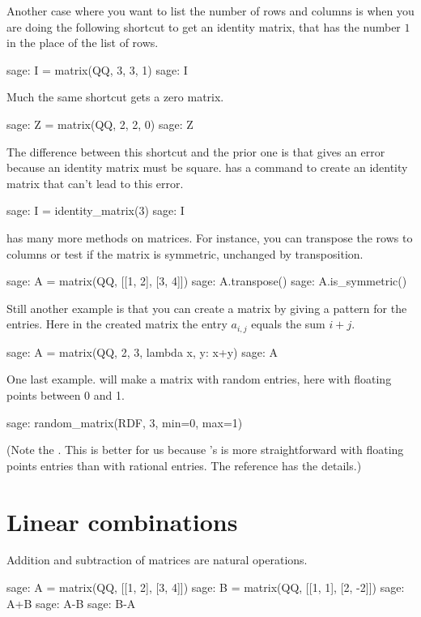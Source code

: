 Another case where you want to list the
number of rows and columns is when you are doing 
the following shortcut to get an identity matrix, that has 
the number $1$ in the place of the list of rows.
\begin{sagecommandline}
sage: I = matrix(QQ, 3, 3, 1)                     
sage: I
\end{sagecommandline}
Much the same shortcut gets a zero matrix.
\begin{sagecommandline}
sage: Z = matrix(QQ, 2, 2, 0)
sage: Z
\end{sagecommandline}
The difference between this shortcut and the prior one is that 
 gives an error because 
an identity matrix must be square.
\Sage{} has a command to create an identity matrix 
that can't lead to this error.
\begin{sagecommandline}
sage: I = identity_matrix(3)
sage: I
\end{sagecommandline}

\Sage{} has many more methods on matrices.
For instance, you can transpose the rows to columns or test if the 
matrix is symmetric,
unchanged by transposition.
\begin{sagecommandline}
sage: A = matrix(QQ, [[1, 2], [3, 4]])
sage: A.transpose()
sage: A.is_symmetric()
\end{sagecommandline}
Still another example is that you can create a matrix by giving a pattern
for the entries.
Here in the created matrix the entry $a_{i,j}$ equals the sum
$i+j$.
\begin{sagecommandline}
sage: A = matrix(QQ, 2, 3, lambda x, y: x+y)
sage: A
\end{sagecommandline}
One last example.
\Sage{} will make a matrix with random entries, here
with floating points between 0 and 1.
\begin{sagecommandline}
sage: random_matrix(RDF, 3, min=0, max=1)
\end{sagecommandline}
(Note the .
This is better for us because \Sage's  
is more straightforward with floating points entries than with 
rational entries.
The \Sage{} reference has the details.)




\section{Linear combinations}
Addition and subtraction of matrices are natural operations.
\begin{sagecommandline}
sage: A = matrix(QQ, [[1, 2], [3, 4]])
sage: B = matrix(QQ, [[1, 1], [2, -2]])
sage: A+B
sage: A-B
sage: B-A
\end{sagecommandline}

